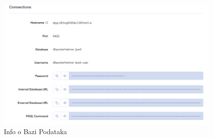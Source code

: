 			\newpage
			\begin{figure} [h]
				\includegraphics[width=\linewidth]{Slike/Info o Bazi Podataka}
				\caption{Info o Bazi Podataka}
			\end{figure}
			
			\newpage
